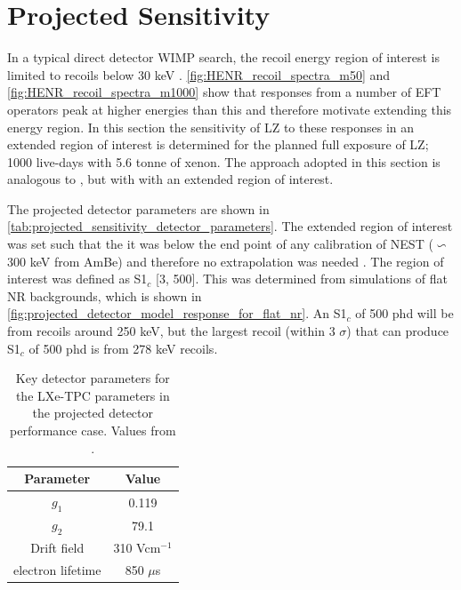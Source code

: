 \section{Projected Sensitivity}
\par
In a typical direct detector WIMP search, the recoil energy region of interest is limited to recoils below 30 keV \cite{LZ_TechnicalDesignReview_ref, LZ_projected_sensitivity_paper_ref, xenonnt_projected_sensitivty_ref}.
\autoref{fig:HENR_recoil_spectra_m50} and \autoref{fig:HENR_recoil_spectra_m1000} show that responses from a number of EFT operators peak at higher energies than this and therefore motivate extending this energy region.
In this section the sensitivity of LZ to these responses in an extended region of interest is determined for the planned full exposure of LZ; 1000 live-days with 5.6 tonne of xenon.
The approach adopted in this section is analogous to \cite{LZ_projected_sensitivity_paper_ref}, but with with an extended region of interest.
\par
The projected detector parameters are shown in \autoref{tab:projected_sensitivity_detector_parameters}.
The extended region of interest was set such that the it was below the end point of any calibration of NEST ($\backsim$ 300 keV from AmBe) and therefore no extrapolation was needed \cite{nest_1_ref}.
The region of interest was defined as S1$_c$ [3, 500].
This was determined from simulations of flat NR backgrounds, which is shown in \autoref{fig:projected_detector_model_response_for_flat_nr}.
An S1$_c$ of 500 phd will be from recoils around 250 keV, but the largest recoil (within 3 $\sigma$) that can produce S1$_c$ of 500 phd is from 278 keV recoils.

\begin{table}[]
    \centering
    \begin{tabular}{c|c}
        Parameter   & Value  \\ \hline
        $g_{1}$     & 0.119 \\
        $g_{2}$     & 79.1  \\
        Drift field & 310 Vcm$^{-1}$ \\
        electron lifetime & 850 $\mu$s
    \end{tabular}
    \caption{Key detector parameters for the LXe-TPC parameters in the projected detector performance case. 
             Values from \cite{LZ_projected_sensitivity_paper_ref}.}
    \label{tab:projected_sensitivity_detector_parameters}
\end{table}

